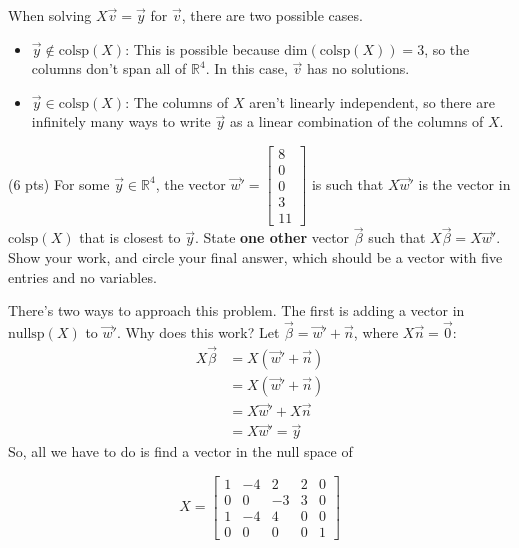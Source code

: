 \documentclass[11pt]{article}
\begin{document}
\begin{prob}
\begin{subprob}
      

\begin{solution}
When solving $X \vec v = \vec y$ for $\vec v$, there are two possible cases.
\begin{itemize}
    \item $\vec y \notin \text{colsp}(X)$: This is possible because $\text{dim}(\text{colsp}(X))=3$, so the columns don't span all of $\mathbb{R}^4$. In this case, $\vec v$ has no solutions.
    \item $\vec y \in \text{colsp}(X)$: The columns of $X$ aren't linearly independent, so there are infinitely many ways to write $\vec y$ as a linear combination of the columns of $X$.
\end{itemize}
\end{solution}
\end{subprob}

\begin{subprob}(6 pts) For some $\vec y \in \mathbb{R}^4$, the vector $\vec w' = \begin{bmatrix} 8 \\ 0 \\ 0 \\ 3 \\ 11 \end{bmatrix}$ is such that $X \vec w'$ is the vector in $\text{colsp}(X)$ that is closest to $\vec y$. State \textbf{one other} vector $\vec \beta$ such that $X \vec \beta = X \vec w'$. Show your work, and $\boxed{\text{circle}}$ your final answer, which should be a vector with five entries and no variables. \\

\emptybox{9cm}

\begin{solution}
There's two ways to approach this problem. The first is adding a vector in $\text{nullsp}(X)$ to $\vec w'$. Why does this work? Let $\vec \beta = \vec w' + \vec n$, where $X\vec n = \vec 0$:
\begin{align*}
X\vec \beta &= X(\vec w' + \vec n)
\\&=X(\vec w' + \vec n) 
\\&=X\vec w' + X\vec n 
\\&=X\vec w' = \vec y 
\end{align*}
So, all we have to do is find a vector in the null space of

$$X = \begin{bmatrix} 1 & -4 & 2 & 2 & 0 \\ 0 & 0 & -3 & 3 & 0 \\ 1 & -4 & 4 & 0 & 0 \\ 0 & 0 & 0 & 0 & 1 \end{bmatrix}$$


\end{solution}
\end{subprob}
\end{prob}
\end{document}
